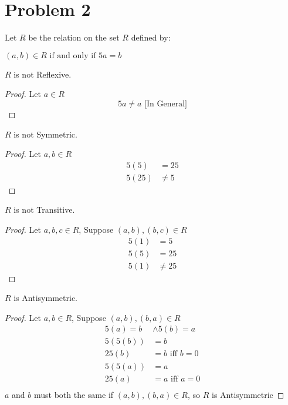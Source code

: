 \documentclass{article}
\newenvironment{problem}[1]{
  \nobreak\section*{Problem #1}
}{}
\begin{document}
  \begin{problem}{2}
    Let $R$ be the relation on the set $R$ defined by:
    \begin{center}
      $(a, b) \in R \text{ if and only if } 5a = b$
    \end{center}

    $R$ is not Reflexive.
    \begin{proof}
      Let $a \in R$
      \begin{equation*}
        5a \neq a \text{ [In General]}
      \end{equation*}
    \end{proof}

    $R$ is not Symmetric.
    \begin{proof}
      Let $a, b \in R$
      \begin{equation*}
        \begin{split}
          5(5) & = 25\\
          5(25) & \neq 5
        \end{split}
      \end{equation*}
    \end{proof}

    $R$ is not Transitive.
    \begin{proof}
      Let $a, b, c \in R$, Suppose $(a, b), (b, c) \in R$
      \begin{equation*}
        \begin{split}
          5(1) & = 5\\
          5(5) & = 25\\
          5(1) & \neq 25
        \end{split}
      \end{equation*}
    \end{proof}

    $R$ is Antisymmetric.
    \begin{proof}
      Let $a, b \in R$, Suppose $(a, b), (b, a) \in R$
      \begin{equation*}
        \begin{split}
          5(a) = b & \wedge 5(b) = a\\
          5(5(b)) & = b\\
          25(b) & = b \text{ iff $b = 0$}\\
          5(5(a)) & = a\\
          25(a) & = a \text{ iff $a = 0$}\\
        \end{split}
      \end{equation*}
      $a$ and $b$ must both the same if $(a, b), (b, a) \in R$, so $R$ is Antisymmetric
    \end{proof}
  \end{problem}
\end{document}

